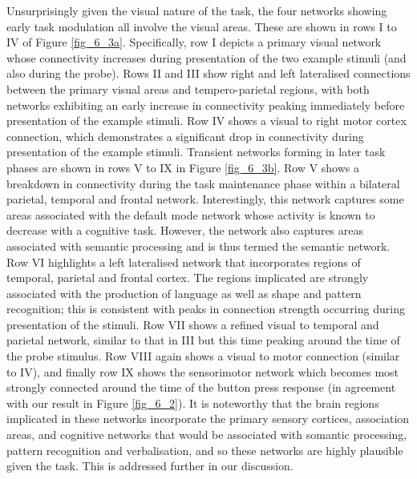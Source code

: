 Unsurprisingly given the visual nature of the task, the four networks showing early task modulation all involve the visual areas. These are shown in rows I to IV of Figure \ref{fig_6_3a}. Specifically, row I depicts a primary visual network whose connectivity increases during presentation of the two example stimuli (and also during the probe). Rows II and III show right and left lateralised connections between the primary visual areas and tempero-parietal regions, with both networks exhibiting an early increase in connectivity peaking immediately before presentation of the example stimuli. Row IV shows a visual to right motor cortex connection, which demonstrates a significant drop in connectivity during presentation of the example stimuli. Transient networks forming in later task phases are shown in rows V to IX in Figure \ref{fig_6_3b}. Row V shows a breakdown in connectivity during the task maintenance phase within a bilateral parietal, temporal and frontal network. Interestingly, this network captures some areas associated with the default mode network whose activity is known to decrease with a cognitive task. However, the network also captures areas associated with semantic processing and is thus termed the semantic network. Row VI highlights a left lateralised network that incorporates regions of temporal, parietal and frontal cortex. The regions implicated are strongly associated with the production of language as well as shape and pattern recognition; this is consistent with peaks in connection strength occurring during presentation of the stimuli. Row VII shows a refined visual to temporal and parietal network, similar to that in III but this time peaking around the time of the probe stimulus. Row VIII again shows a visual to motor connection (similar to IV), and finally row IX shows the sensorimotor network which becomes most strongly connected around the time of the button press response (in agreement with our result in Figure \ref{fig_6_2}). It is noteworthy that the brain regions implicated in these networks incorporate the primary sensory cortices, association areas, and cognitive networks that would be associated with somantic processing, pattern recognition and verbalisation, and so these networks are highly plausible given the task. This is addressed further in our discussion.

\clearpage

